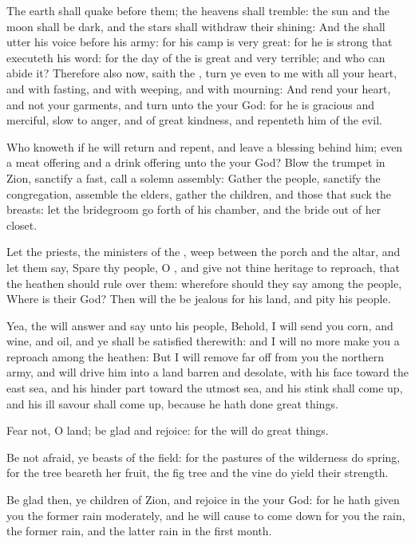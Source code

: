 \verse The earth shall quake before them; the heavens shall tremble: the sun and the moon shall be dark, and the stars shall withdraw their shining: \verse And the \LORD shall utter his voice before his army: for his camp is very great: for he is strong that executeth his word: for the day of the \LORD is great and very terrible; and who can abide it?  \verse Therefore also now, saith the \LORD, turn ye even to me with all your heart, and with fasting, and with weeping, and with mourning: \verse And rend your heart, and not your garments, and turn unto the \LORD your God: for he is gracious and merciful, slow to anger, and of great kindness, and repenteth him of the evil.

\verse Who knoweth if he will return and repent, and leave a blessing behind him; even a meat offering and a drink offering unto the \LORD your God?  \verse Blow the trumpet in Zion, sanctify a fast, call a solemn assembly: \verse Gather the people, sanctify the congregation, assemble the elders, gather the children, and those that suck the breasts: let the bridegroom go forth of his chamber, and the bride out of her closet.

\verse Let the priests, the ministers of the \LORD, weep between the porch and the altar, and let them say, Spare thy people, O \LORD, and give not thine heritage to reproach, that the heathen should rule over them: wherefore should they say among the people, Where is their God?  \verse Then will the \LORD be jealous for his land, and pity his people.

\verse Yea, the \LORD will answer and say unto his people, Behold, I will send you corn, and wine, and oil, and ye shall be satisfied therewith: and I will no more make you a reproach among the heathen: \verse But I will remove far off from you the northern army, and will drive him into a land barren and desolate, with his face toward the east sea, and his hinder part toward the utmost sea, and his stink shall come up, and his ill savour shall come up, because he hath done great things.

\verse Fear not, O land; be glad and rejoice: for the \LORD will do great things.

\verse Be not afraid, ye beasts of the field: for the pastures of the wilderness do spring, for the tree beareth her fruit, the fig tree and the vine do yield their strength.

\verse Be glad then, ye children of Zion, and rejoice in the \LORD your God: for he hath given you the former rain moderately, and he will cause to come down for you the rain, the former rain, and the latter rain in the first month.

